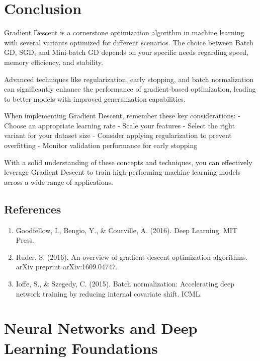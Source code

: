 \documentclass[
  letterpaper,
  DIV=11,
  numbers=noendperiod]{scrreprt}
\providecommand{\tightlist}{%
  \setlength{\itemsep}{0pt}\setlength{\parskip}{0pt}}\usepackage{longtable,booktabs,array}
\begin{document}

\chapter{Conclusion}\label{conclusion-2}

Gradient Descent is a cornerstone optimization algorithm in machine
learning with several variants optimized for different scenarios. The
choice between Batch GD, SGD, and Mini-batch GD depends on your specific
needs regarding speed, memory efficiency, and stability.

Advanced techniques like regularization, early stopping, and batch
normalization can significantly enhance the performance of
gradient-based optimization, leading to better models with improved
generalization capabilities.

When implementing Gradient Descent, remember these key considerations: -
Choose an appropriate learning rate - Scale your features - Select the
right variant for your dataset size - Consider applying regularization
to prevent overfitting - Monitor validation performance for early
stopping

With a solid understanding of these concepts and techniques, you can
effectively leverage Gradient Descent to train high-performing machine
learning models across a wide range of applications.

\section{References}\label{references-1}

\begin{enumerate}
\def\labelenumi{\arabic{enumi}.}
\tightlist
\item
  Goodfellow, I., Bengio, Y., \& Courville, A. (2016). Deep Learning.
  MIT Press.
\item
  Ruder, S. (2016). An overview of gradient descent optimization
  algorithms. arXiv preprint arXiv:1609.04747.
\item
  Ioffe, S., \& Szegedy, C. (2015). Batch normalization: Accelerating
  deep network training by reducing internal covariate shift. ICML.
\end{enumerate}


\chapter{Neural Networks and Deep Learning
Foundations}\label{neural-networks-and-deep-learning-foundations}
\end{document}
